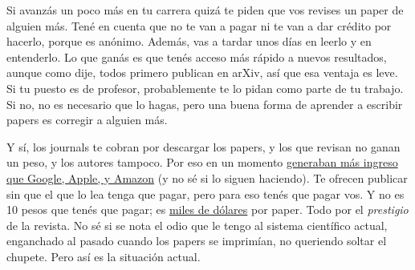 \documentclass{article}
\begin{document}
Si avanzás un poco más en tu carrera quizá te piden que vos revises un paper de alguien más. Tené en cuenta que no te van a pagar ni te van a dar crédito por hacerlo, porque es anónimo. Además, vas a tardar unos días en leerlo y en entenderlo. Lo que ganás es que tenés acceso más rápido a nuevos resultados, aunque como dije, todos primero publican en arXiv, así que esa ventaja es leve. Si tu puesto es de profesor, probablemente te lo pidan como parte de tu trabajo. Si no, no es necesario que lo hagas, pero una buena forma de aprender a escribir papers es corregir a alguien más.

Y sí, los journals te cobran por descargar los papers, y los que revisan no ganan un peso, y los autores tampoco. Por eso en un momento \href{https://www.theguardian.com/science/2017/jun/27/profitable-business-scientific-publishing-bad-for-science}{generaban más ingreso que Google, Apple, y Amazon} (y no sé si lo siguen haciendo). Te ofrecen publicar sin que el que lo lea tenga que pagar, pero para eso tenés que pagar vos. Y no es 10 pesos que tenés que pagar; es \href{https://www.elsevier.com/about/policies-and-standards/pricing#1-publishing-charges}{miles de dólares} por paper. Todo por el \emph{prestigio} de la revista. No sé si se nota el odio que le tengo al sistema científico actual, enganchado al pasado cuando los papers se imprimían, no queriendo soltar el chupete. Pero así es la situación actual.
\end{document}
